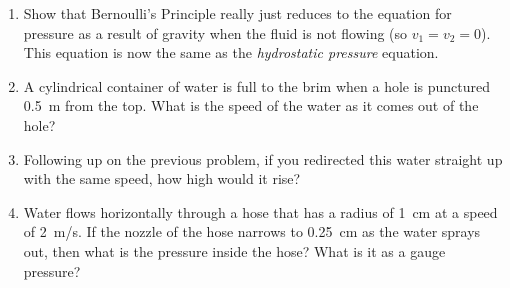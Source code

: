\begin{enumerate}
	\item
	Show that Bernoulli's Principle really just reduces to the equation for pressure as a result of gravity when the fluid is not flowing (so $v_1=v_2=0$). This equation is now the same as the \emph{hydrostatic pressure} equation. 
	
	\item
	A cylindrical container of water is full to the brim when a hole is punctured \SI{0.5}{\meter} from the top. What is the speed of the water as it comes out of the hole?
	
	\item 
	Following up on the previous problem, if you redirected this water straight up with the same speed, how high would it rise?
	
	\item
	Water flows horizontally through a hose that has a radius of \SI{1}{cm} at a speed of \SI{2}{m/s}. If the nozzle of the hose narrows to \SI{0.25}{cm} as the water sprays out, then what is the pressure inside the hose? What is it as a gauge pressure?
	
	
\end{enumerate}